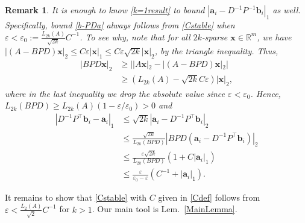 \documentclass[journal, twocolumn]{IEEEtran}
\newtheorem{remark}{Remark}
\begin{document}
\begin{remark}\label{b-PDaProof}
It is enough to know \eqref{k=1result} to bound $|\mathbf{a}_i - D^{-1}P^{-1}\mathbf{b}_i|_1$ as well. Specifically, bound \eqref{b-PDa} always follows from \eqref{Cstable} when $\varepsilon < \varepsilon_0 := \frac{L_{2k}(A)}{\sqrt{2k}}C^{-1}$. To see why, note that for all $2k$-sparse $\mathbf{x} \in \mathbb{R}^m$, we have $|(A-BPD)\mathbf{x}|_2 
\leq C\varepsilon|\mathbf{x}|_1
\leq C \varepsilon \sqrt{2k}  |\mathbf{x}|_2$,
by the triangle inequality. Thus,
\begin{align*}
|BPD\mathbf{x}|_2 
&\geq | |A\mathbf{x}|_2 - |(A-BPD)\mathbf{x}|_2 | \\
&\geq (L_{2k}(A) - \sqrt{2k}C\varepsilon ) |\mathbf{x}|_2,
\end{align*}
%
where in the last inequality we drop the absolute value since $\varepsilon < \varepsilon_0$. Hence, $L_{2k}(BPD) \geq L_{2k}(A)\left( 1 - \varepsilon/\varepsilon_0 \right) > 0$ and %
\begin{align*}
|D^{-1}P^{\top}\mathbf{b}_i - \mathbf{a}_i|_1
&\leq \sqrt{2k} |\mathbf{a}_i - D^{-1}P^{\top}\mathbf{b}_i|_2 \\
&\leq \frac{\sqrt{2k}}{L_{2k}(BPD)}|BPD(\mathbf{a}_i - D^{-1}P^{\top}\mathbf{b}_i)|_2 \\
&\leq \frac{\varepsilon\sqrt{2k}}{L_{2k}(BPD)}(1+C|\mathbf{a}_i|_1) \\
&\leq \frac{\varepsilon }{\varepsilon_0 - \varepsilon} \left( C^{-1}+|\mathbf{a}_i|_1 \right).
\end{align*}
\end{remark}

It remains to show that \eqref{Cstable} with $C$ given in \eqref{Cdef} follows from $\varepsilon < \frac{L_2(A)}{\sqrt{2}}C^{-1}$ for $k > 1$. Our main tool is Lem.~\ref{MainLemma}.
\end{document}
